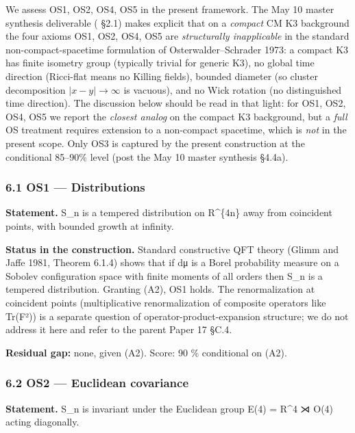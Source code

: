 \documentclass[
 11pt,
 a4paper,
]{article}
\begin{document}
We assess OS1, OS2, OS4, OS5 in the present framework. The May 10 master synthesis deliverable (\texttt{} §2.1) makes explicit that on a \emph{compact} CM K3 background the four axioms OS1, OS2, OS4, OS5 are \emph{structurally inapplicable} in the standard non-compact-spacetime formulation of Osterwalder--Schrader 1973: a compact K3 has finite isometry group (typically trivial for generic K3), no global time direction (Ricci-flat means no Killing fields), bounded diameter (so cluster decomposition \(|x-y| \to \infty\) is vacuous), and no Wick rotation (no distinguished time direction). The discussion below should be read in that light: for OS1, OS2, OS4, OS5 we report the \emph{closest analog} on the compact K3 background, but a \emph{full} OS treatment requires extension to a non-compact spacetime, which is \emph{not} in the present scope. Only OS3 is captured by the present construction at the conditional 85--90\% level (post the May 10 master synthesis §4.4a).

\hypertarget{os1-distributions}{%
\subsubsection{6.1 OS1 --- Distributions}\label{os1-distributions}}

\textbf{Statement.} S\_n is a tempered distribution on R\^{}\{4n\} away from coincident points, with bounded growth at infinity.

\textbf{Status in the construction.} Standard constructive QFT theory (Glimm and Jaffe 1981, Theorem 6.1.4) shows that if dμ is a Borel probability measure on a Sobolev configuration space with finite moments of all orders then S\_n is a tempered distribution. Granting (A2), OS1 holds. The renormalization at coincident points (multiplicative renormalization of composite operators like Tr(F²)) is a separate question of operator-product-expansion structure; we do not address it here and refer to the parent Paper 17 §C.4.

\textbf{Residual gap:} none, given (A2). Score: 90 \% conditional on (A2).

\hypertarget{os2-euclidean-covariance}{%
\subsubsection{6.2 OS2 --- Euclidean covariance}\label{os2-euclidean-covariance}}

\textbf{Statement.} S\_n is invariant under the Euclidean group E(4) = R\^{}4 ⋊ O(4) acting diagonally.
\end{document}
